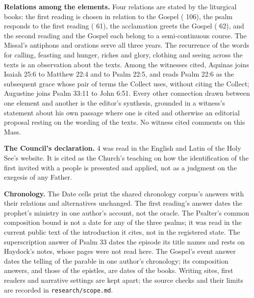 {\textbf{Relations among the elements.} Four relations are stated by the
liturgical books: the first reading is chosen in relation to the Gospel
( 106), the psalm responds to the first reading
( 61), the acclamation greets the Gospel
( 62), and the second reading and the Gospel each
belong to a semi-continuous course. The Missal's antiphons and orations serve
all three years. The recurrence of the words for calling, feasting and hunger,
riches and glory, clothing and seeing across the texts is an observation about
the texts. Among the witnesses cited, Aquinas joins Isaiah 25:6 to Matthew
22:4 and to Psalm 22:5, and reads Psalm 22:6 as the subsequent grace whose
pair of terms the Collect uses, without citing the Collect; Augustine joins
Psalm 33:11 to John 6:51. Every other connection drawn between one element and
another is the editor's synthesis, grounded in a witness's statement about his
own passage where one is cited and otherwise an editorial proposal resting on
the wording of the texts. No witness cited comments on this Mass.

\textbf{The Council's declaration.}  4 was read in the
English and Latin of the Holy See's website. It is cited as the Church's
teaching on how the identification of the first invited with a people is
presented and applied, not as a judgment on the exegesis of any Father.

\textbf{Chronology.} The Date cells print the shared chronology corpus's
answers with their relations and alternatives unchanged. The first reading's
answer dates the prophet's ministry in one author's account, not the oracle.
The Psalter's common composition bound is not a date for any of the three
psalms; it was read in the current public text of the introduction it cites,
not in the registered state. The superscription answer of Psalm 33 dates the
episode its title names and rests on Haydock's notes, whose pages were not
read here. The Gospel's event answer dates the telling of the parable in one
author's chronology; its composition answers, and those of the epistles, are
dates of the books. Writing sites, first readers and narrative settings are
kept apart; the source checks and their limits are recorded in
\texttt{research/scope.md}.

}
